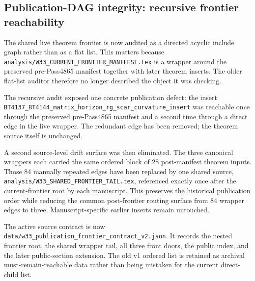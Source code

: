 \subsection{Publication-DAG integrity: recursive frontier reachability}

The shared live theorem frontier is now audited as a directed acyclic include graph rather
than as a flat list.  This matters because
\texttt{analysis/W33\_CURRENT\_FRONTIER\_MANIFEST.tex} is a wrapper around the
preserved pre-Pass4865 manifest together with later theorem inserts.  The older flat-list
auditor therefore no longer described the object it was checking.

The recursive audit exposed one concrete publication defect: the insert
\texttt{BT4137\_BT4144\_matrix\_horizon\_rg\_scar\_curvature\_insert} was reachable
once through the preserved pre-Pass4865 manifest and a second time through a direct edge in
the live wrapper.  The redundant edge has been removed; the theorem source itself is
unchanged.

A second source-level drift surface was then eliminated.  The three canonical wrappers each
carried the same ordered block of 28 post-manifest theorem inputs.  Those 84 manually repeated
edges have been replaced by one shared source,
\texttt{analysis/W33\_SHARED\_FRONTIER\_TAIL.tex}, referenced exactly once after the
current-frontier root by each manuscript.  This preserves the historical publication order
while reducing the common post-frontier routing surface from 84 wrapper edges to three.
Manuscript-specific earlier inserts remain untouched.

The active source contract is now
\texttt{data/w33\_publication\_frontier\_contract\_v2.json}.  It records the nested
frontier root, the shared wrapper tail, all three front doors, the public index, and the later
public-section extension.  The old v1 ordered list is retained as archival must-remain-reachable
data rather than being mistaken for the current direct-child list.

